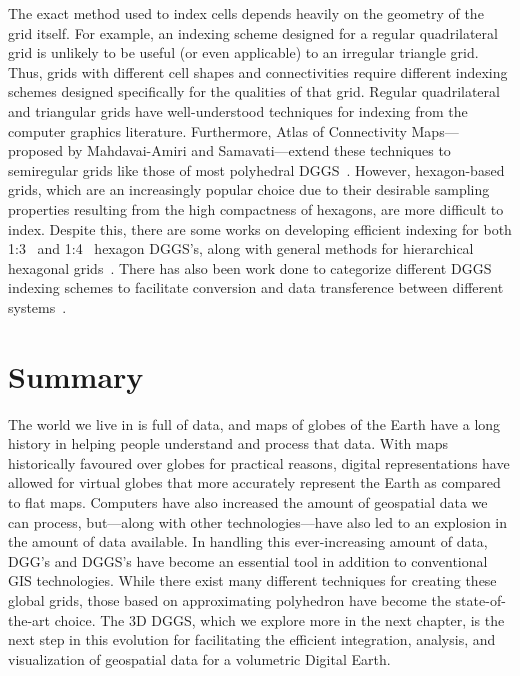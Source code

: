 The exact method used to index cells depends heavily on the geometry of the grid itself.
For example, an indexing scheme designed for a regular quadrilateral grid is unlikely to be useful (or even applicable) to an irregular triangle grid.
Thus, grids with different cell shapes and connectivities require different indexing schemes designed specifically for the qualities of that grid.
Regular quadrilateral and triangular grids have well-understood techniques for indexing from the computer graphics literature.
Furthermore, Atlas of Connectivity Maps---proposed by Mahdavai-Amiri and Samavati---extend these techniques to semiregular grids like those of most polyhedral DGGS~\cite{mahdavi2014atlas}.
However, hexagon-based grids, which are an increasingly popular choice due to their desirable sampling properties resulting from the high compactness of hexagons, are more difficult to index.
Despite this, there are some works on developing efficient indexing for both 1:3~\cite{vince2006indexing} and 1:4~\cite{tong2013efficient} hexagon DGGS's, along with general methods for hierarchical hexagonal grids~\cite{mahdavi2015hexagonal}.
There has also been work done to categorize different DGGS indexing schemes to facilitate conversion and data transference between different systems~\cite{mahdavi2015categorization}.


\section{Summary} \label{chap:2:summary}
The world we live in is full of data, and maps of globes of the Earth have a long history in helping people understand and process that data.
With maps historically favoured over globes for practical reasons, digital representations have allowed for virtual globes that more accurately represent the Earth as compared to flat maps.
Computers have also increased the amount of geospatial data we can process, but---along with other technologies---have also led to an explosion in the amount of data available.
In handling this ever-increasing amount of data, DGG's and DGGS's have become an essential tool in addition to conventional GIS technologies.
While there exist many different techniques for creating these global grids, those based on approximating polyhedron have become the state-of-the-art choice.
The 3D DGGS, which we explore more in the next chapter, is the next step in this evolution for facilitating the efficient integration, analysis, and visualization of geospatial data for a volumetric Digital Earth.
